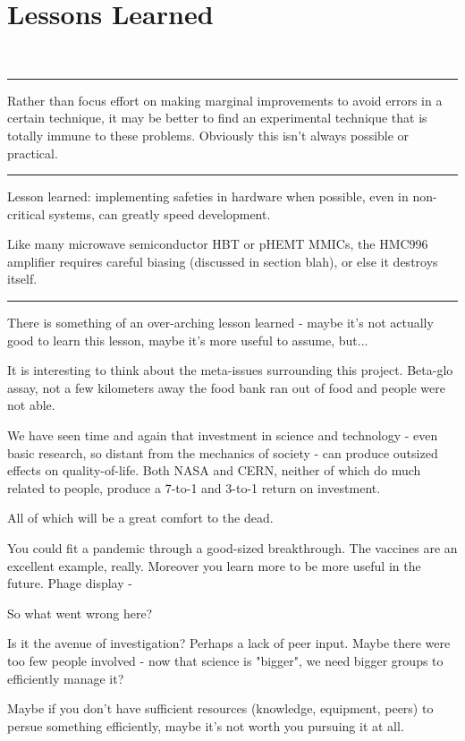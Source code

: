 \documentclass[paper.tex]{subfiles}
\begin{document}
\section{Lessons Learned} \

\rule{\linewidth}{0.2pt}

Rather than focus effort on making marginal improvements to avoid errors in a certain technique, it may be better to find an experimental technique that is totally immune to these problems. Obviously this isn't always possible or practical.


\rule{\linewidth}{0.2pt}


Lesson learned: implementing safeties in hardware when possible, even in non-critical systems, can greatly speed development.

Like many microwave semiconductor HBT or pHEMT MMICs, the HMC996 amplifier requires careful biasing (discussed in section blah), or else it destroys itself. 


\rule{\linewidth}{0.2pt}


There is something of an over-arching lesson learned - maybe it's not actually good to learn this lesson, maybe it's more useful to assume, but...

It is interesting to think about the meta-issues surrounding this project. Beta-glo assay, not a few kilometers away the food bank ran out of food and people were not able. 

We have seen time and again that investment in science and technology - even basic research, so distant from the mechanics of society - can produce outsized effects on quality-of-life. Both NASA and CERN, neither of which do much related to people, produce a 7-to-1 and 3-to-1 return on investment. 

All of which will be a great comfort to the dead. 

You could fit a pandemic through a good-sized breakthrough. The vaccines are an excellent example, really. Moreover you learn more to be more useful in the future. Phage display  - 

So what went wrong here? 

Is it the avenue of investigation? Perhaps a lack of peer input. Maybe there were too few people involved - now that science is "bigger", we need bigger groups to efficiently manage it? 

Maybe if you don't have sufficient resources (knowledge, equipment, peers) to persue something efficiently, maybe it's not worth you pursuing it at all.
\end{document}
